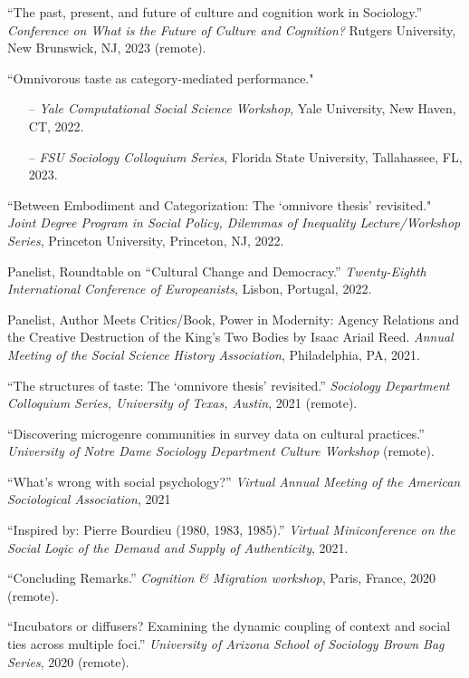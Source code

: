 
\ind ``The past, present, and future of culture and cognition work in Sociology.'' {\em Conference on What is the Future of Culture and Cognition?} Rutgers University, New Brunswick, NJ, 2023 (remote). 

\ind ``Omnivorous taste as category-mediated performance."  
\begin{itemize}[leftmargin=0.8in, topsep = 0pt]
	\setlength\itemsep{-0.55em}
	\item[--] {\em Yale Computational Social Science Workshop}, Yale University, New Haven, CT, 2022.
	\item[--] {\em FSU Sociology Colloquium Series}, Florida State University, Tallahassee, FL, 2023.
\end{itemize}

\ind ``Between Embodiment and Categorization: The `omnivore thesis' revisited." {\em Joint Degree Program in Social Policy, Dilemmas of Inequality Lecture/Workshop Series}, Princeton University, Princeton, NJ, 2022. 

\ind Panelist, Roundtable on ``Cultural Change and Democracy.'' {\em Twenty-Eighth International Conference of Europeanists}, Lisbon, Portugal, 2022. 

\ind Panelist, Author Meets Critics/Book, Power in Modernity: Agency Relations and the Creative Destruction of the King's Two Bodies by Isaac Ariail Reed. {\em Annual Meeting of the Social Science History Association}, Philadelphia, PA, 2021.

\ind ``The structures of taste: The `omnivore thesis' revisited.'' {\em Sociology Department Colloquium Series, University of Texas, Austin}, 2021 (remote). 

\ind ``Discovering microgenre communities in survey data on cultural practices.'' {\em University of Notre Dame Sociology Department Culture Workshop} (remote).

\ind ``What's wrong with social psychology?'' {\em Virtual Annual Meeting of the American Sociological Association}, 2021

\ind ``Inspired by: Pierre Bourdieu (1980, 1983, 1985).'' {\em Virtual Miniconference on the Social Logic of the Demand and Supply of Authenticity}, 2021.

\ind ``Concluding Remarks.'' {\em Cognition \& Migration workshop}, Paris, France, 2020 (remote).

\ind ``Incubators or diffusers? Examining the dynamic coupling of context and social ties across multiple foci.'' {\em University of Arizona School of Sociology Brown Bag Series},  2020 (remote).

